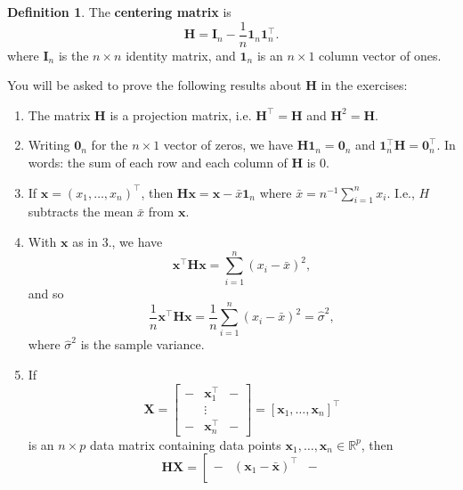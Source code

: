 \documentclass[]{book}
\providecommand{\tightlist}{%
  \setlength{\itemsep}{0pt}\setlength{\parskip}{0pt}}
\theoremstyle{definition}
\newtheorem{definition}{Definition}[chapter]
\theoremstyle{definition}
\theoremstyle{definition}
\theoremstyle{remark}
\begin{document}
\begin{definition}
\protect\hypertarget{def:centeringmatrix}{}{\label{def:centeringmatrix} } The \textbf{centering matrix} is
\begin{equation}
\boldsymbol H=\mathbf I_n - \frac{1}{n} {\mathbf 1}_n {\mathbf 1}_n^\top.
\label{eq:Hcentre}
\end{equation}
where \(\mathbf I_n\) is the \(n \times n\) identity matrix, and \({\mathbf 1}_n\) is an \(n \times 1\) column vector of ones.
\end{definition}

You will be asked to prove the following results about \(\boldsymbol H\) in the exercises:

\begin{enumerate}
\def\labelenumi{\arabic{enumi}.}
\tightlist
\item
  The matrix \(\boldsymbol H\) is a projection matrix, i.e. \(\boldsymbol H^\top =\boldsymbol H\) and \(\boldsymbol H^2=\boldsymbol H\).
\item
  Writing \({\mathbf 0}_n\) for the \(n \times 1\) vector of zeros, we have
  \(\boldsymbol H{\mathbf 1}_n={\mathbf 0}_n\) and \({\mathbf 1}_n^\top \boldsymbol H={\mathbf 0}_n^\top.\) In words: the sum of each row and each column of \(\boldsymbol H\) is \(0\).
\item
  If \(\boldsymbol x=(x_1, \ldots , x_n)^\top\), then \(\boldsymbol H\boldsymbol x= \boldsymbol x- \bar{x}{\mathbf 1}_n\) where \(\bar{x}=n^{-1}\sum_{i=1}^n x_i\). I.e., \(H\) subtracts the mean \(\bar{x}\) from \(\boldsymbol x\).
\item
  With \(\boldsymbol x\) as in 3., we have
  \[
  \boldsymbol x^\top \boldsymbol H\boldsymbol x= \sum_{i=1}^n (x_i-\bar{x})^2,
  \]
  and so
  \[
  \frac{1}{n}\boldsymbol x^\top \boldsymbol H\boldsymbol x=\frac{1}{n}\sum_{i=1}^n (x_i-\bar{x})^2 = \hat{\sigma}^2,
  \]
  where \(\hat{\sigma}^2\) is the sample variance.
\item
  If
  \[\boldsymbol X=\left[\begin{array}{ccc}-&\boldsymbol x_1^\top&-\\ 
  &\vdots& \\ -&\boldsymbol x_n^\top&-\end{array}\right] = [\boldsymbol x_1, \ldots, \boldsymbol x_n]^\top\]
  is an \(n \times p\) data matrix containing data points \(\boldsymbol x_1, \ldots, \boldsymbol x_n\in \mathbb{R}^p\), then
  \[
  \boldsymbol H\boldsymbol X=\left[ \begin{array}{ccc}
  -&(\boldsymbol x_1-\bar{\boldsymbol x})^\top&-\\

\end{array}\]
\end{enumerate}
\end{document}
